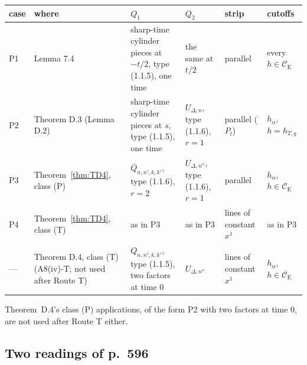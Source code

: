 \documentclass[11pt,a4paper]{article}
\newcommand{\CE}{\mathcal{C}_{\mathrm E}}
\theoremstyle{plain}
\theoremstyle{definition}
\begin{document}
\begin{center}\small
\begin{tabular}{@{}p{}p{}p{}p{}p{}p{}@{}}
\toprule
case & where & $Q_1$ & $Q_2$ & strip & cutoffs\\
\midrule
P1 & Lemma 7.4 & sharp-time cylinder pieces at $-t/2$, type (1.1.5), one time & the same at
$t/2$ & parallel & every $h\in\CE$\\
P2 & Theorem D.3 (Lemma D.2) & sharp-time cylinder pieces at $s$, type (1.1.5), one time &
$U_{\Delta,n}$, type (1.1.6), $r=1$ & parallel ($P_l$) & $h_\alpha$, $h=h_{T,g}$\\
P3 & Theorem~\ref{thm:TD4}, class (P) & $\overline Q_{n,n',k,k'}$, type (1.1.6), $r=2$ &
$U_{\Delta,n''}$, type (1.1.6), $r=1$ & parallel & $h_\alpha$, $h\in\CE$\\
P4 & Theorem~\ref{thm:TD4}, class (T) & as in P3 & as in P3 & lines of constant $x^1$ & as in
P3\\
\midrule
--- & Theorem D.4, class (T) (A8(iv)-T; not used after Route T) & $Q_{n,n',k,k'}$, type (1.1.5),
two factors at time $0$ & $U_{\Delta,n''}$ & lines of constant $x^1$ & $h_\alpha$, $h\in\CE$\\
\bottomrule
\end{tabular}
\end{center}

Theorem~D.4's class (P) applications, of the form P2 with two factors at time $0$, are not used
after Route T either.

\subsection{Two readings of p.~596}\label{sec:readings}
\end{document}
